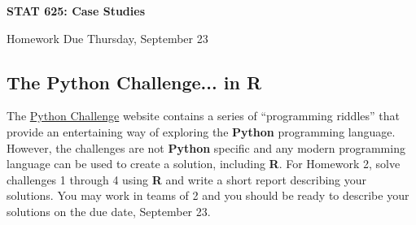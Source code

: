 \documentclass[12pt]{article}
\newcommand{\proglang}[1]{\textbf{#1}}
\begin{document}
\doublespace




\begin{center}


{\Large\bf STAT 625: Case Studies\\
\vspace*{0.5cm}

Homework Due Thursday, September 23\\


}



\end{center}

\begin{raggedright}
\parindent=0.5in


\section{The \proglang{Python} Challenge... in \proglang{R}}

The \href{http://www.pythonchallenge.com}{Python Challenge} website contains
a series of ``programming riddles'' that provide an entertaining way
of exploring the \proglang{Python} programming language.  
However, the challenges are not \proglang{Python} specific and 
any modern programming language can be used to create a solution,
including \proglang{R}.
For Homework 2, solve challenges 1 through 4 using \proglang{R} and 
write a short report describing 
your solutions.  You may work in teams of 2 and you should be ready to 
describe your solutions on the due date, September 23.


\end{raggedright}
\end{document}
